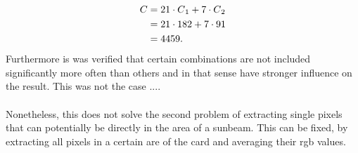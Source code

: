 \begin{align*}
C &= 21 \cdot C\textsubscript{1} + 7 \cdot C\textsubscript{2}\\
&= 21 \cdot 182 + 7 \cdot 91\\
&= 4459. 
\end{align*}
Furthermore is was verified that certain combinations are not included significantly more often than others and in that sense have stronger influence on the result. This was not the case .... \\\\
Nonetheless, this does not solve the second problem of extracting single pixels that can potentially be directly in the area of a sunbeam. This can be fixed, by extracting all pixels in a certain are of the card and averaging their rgb values. %
